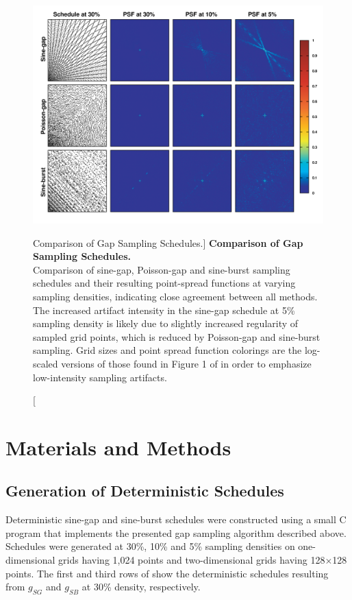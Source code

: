 \begin{figure}[ht!]
\includegraphics[width=6in]{figs/dgs/05-psf.png}
\caption
      [Comparison of Gap Sampling Schedules.]{
  {\bf Comparison of Gap Sampling Schedules.}
  \\
  Comparison of sine-gap, Poisson-gap and sine-burst sampling schedules and
  their resulting point-spread functions at varying sampling densities,
  indicating close agreement between all methods. The increased artifact
  intensity in the sine-gap schedule at 5\% sampling density is likely due
  to slightly increased regularity of sampled grid points, which is reduced
  by Poisson-gap and sine-burst sampling. Grid sizes and point spread function
  colorings are the log-scaled versions of those found in Figure 1 of
  \cite{hoch:acr2014} in order to emphasize low-intensity sampling artifacts.
}
\label{figure.2.5}
\end{figure}

\section{Materials and Methods}

\subsection{Generation of Deterministic Schedules}

\begin{doublespace}
Deterministic sine-gap and sine-burst schedules were constructed using a small
C program that implements the presented gap sampling algorithm described above.
Schedules were generated at 30\%, 10\% and 5\% sampling densities on
one-dimensional grids having 1,024 points and two-dimensional grids having
128$\times$128 points. The first and third rows of 
show the deterministic schedules resulting from $g_{SG}$ and $g_{SB}$
at 30\% density, respectively.
\end{doublespace}


